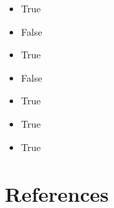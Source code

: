 \documentclass[
  nswissgerman,
  a4paper,
  DIV=11,
  numbers=noendperiod,
  oneside,
  openany]{scrreprt}
\providecommand{\tightlist}{%
  \setlength{\itemsep}{0pt}\setlength{\parskip}{0pt}}
\begin{document}
\begin{itemize}
\tightlist
\item
  True
\item
  False
\item
  True
\item
  False
\item
  True
\item
  True
\item
  True
\end{itemize}


\chapter*{References}\label{references}

\end{document}
